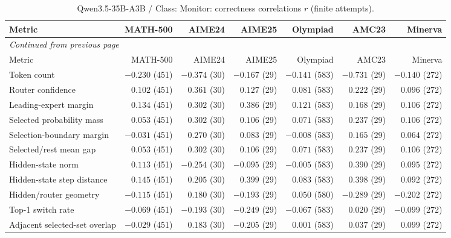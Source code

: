 \begingroup\scriptsize\setlength{\tabcolsep}{4pt}
\begin{longtable}{@{}lrrrrrr@{}}
\caption{Qwen3.5-35B-A3B / Class: Monitor: correctness correlations $r$ (finite attempts).}\label{tab:multi-qwen-class-Monitor}\\
\toprule
Metric & MATH-500 & AIME24 & AIME25 & Olympiad & AMC23 & Minerva \\
\midrule\endfirsthead
\multicolumn{7}{l}{\textit{Continued from previous page}}\\
\toprule
Metric & MATH-500 & AIME24 & AIME25 & Olympiad & AMC23 & Minerva \\
\midrule\endhead
\bottomrule\endfoot
Token count & $-0.230$ (451) & $-0.374$ (30) & $-0.167$ (29) & $-0.141$ (583) & $-0.731$ (29) & $-0.140$ (272) \\
Router confidence & $0.102$ (451) & $0.361$ (30) & $0.127$ (29) & $0.081$ (583) & $0.222$ (29) & $0.096$ (272) \\
Leading-expert margin & $0.134$ (451) & $0.302$ (30) & $0.386$ (29) & $0.121$ (583) & $0.168$ (29) & $0.106$ (272) \\
Selected probability mass & $0.053$ (451) & $0.302$ (30) & $0.106$ (29) & $0.071$ (583) & $0.237$ (29) & $0.106$ (272) \\
Selection-boundary margin & $-0.031$ (451) & $0.270$ (30) & $0.083$ (29) & $-0.008$ (583) & $0.165$ (29) & $0.064$ (272) \\
Selected/rest mean gap & $0.053$ (451) & $0.302$ (30) & $0.106$ (29) & $0.071$ (583) & $0.237$ (29) & $0.106$ (272) \\
Hidden-state norm & $0.113$ (451) & $-0.254$ (30) & $-0.095$ (29) & $-0.005$ (583) & $0.390$ (29) & $0.095$ (272) \\
Hidden-state step distance & $0.145$ (451) & $0.205$ (30) & $0.399$ (29) & $0.083$ (583) & $0.398$ (29) & $0.092$ (272) \\
Hidden/router geometry & $-0.115$ (451) & $0.180$ (30) & $-0.193$ (29) & $0.050$ (580) & $-0.289$ (29) & $-0.202$ (272) \\
Top-1 switch rate & $-0.069$ (451) & $-0.193$ (30) & $-0.249$ (29) & $-0.067$ (583) & $0.020$ (29) & $-0.099$ (272) \\
Adjacent selected-set overlap & $-0.029$ (451) & $0.183$ (30) & $-0.205$ (29) & $0.001$ (583) & $0.037$ (29) & $0.099$ (272) \\
\end{longtable}\endgroup

